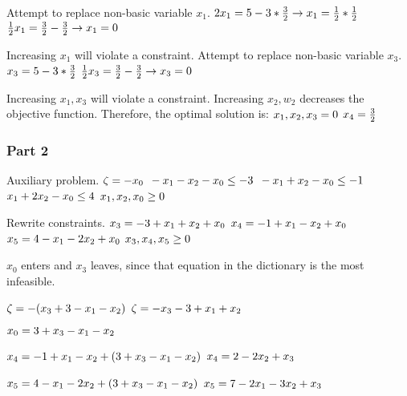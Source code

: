 \documentclass[17pt]{extarticle}
\begin{document}
\bigskip Attempt to replace non-basic variable $x_1$.
$\\ 2x_1 = 5 - 3 * \frac{3}{2} \to x_1 = \frac{1}{2} * \frac{1}{2}$
$\\ \frac{1}{2}x_1 = \frac{3}{2} - \frac{3}{2} \to x_1 = 0$

\bigskip Increasing $x_1$ will violate a constraint. Attempt to replace non-basic variable $x_3$.
$\\ x_3 = 5 - 3 * \frac{3}{2}$
$\\ \frac{1}{2}x_3 = \frac{3}{2} - \frac{3}{2} \to x_3 = 0$

\bigskip Increasing $x_1, x_3$ will violate a constraint. Increasing $x_2, w_2$ decreases the objective function. Therefore, the optimal solution is:
$\\x_1, x_2, x_3 = 0$
$\\x_4 = \frac{3}{2}$

\subsubsection*{Part 2}
Auxiliary problem.
$\\\zeta = -x_0$
$\\ -x_1 - x_2 - x_0 \leq -3$
$\\ -x_1 + x_2 - x_0 \leq -1$
$\\ x_1 + 2x_2 - x_0 \leq 4$
$\\ x_1, x_2, x_0 \geq 0$

\bigskip Rewrite constraints.
$\\ x_3 = - 3 + x_1 + x_2 + x_0$
$\\ x_4 = - 1 + x_1 - x_2 + x_0$
$\\ x_5 = 4 - x_1 - 2x_2 + x_0$
$\\ x_3, x_4, x_5 \geq 0$

\bigskip $x_0$ enters and $x_3$ leaves, since that equation in the dictionary is the most infeasible.

$\\\zeta = -(x_3 + 3 - x_1 - x_2)$
$\\\zeta = -x_3 - 3 + x_1 + x_2$

$\\ x_0 = 3 + x_3 - x_1 - x_2$

$\\ x_4 = - 1 + x_1 - x_2 + (3 + x_3 - x_1 - x_2)$
$\\ x_4 = 2 - 2x_2 + x_3$

$\\ x_5 = 4 - x_1 - 2x_2 + (3 + x_3 - x_1 - x_2)$
$\\ x_5 = 7 - 2x_1 - 3x_2 + x_3$
\end{document}
